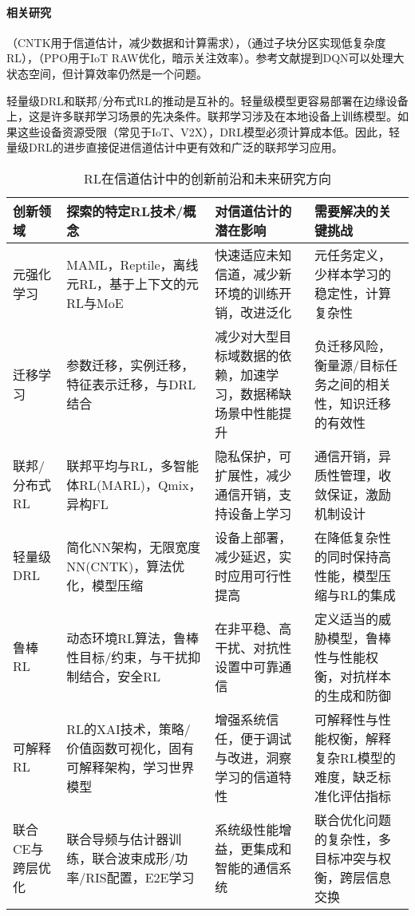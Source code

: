 \documentclass[journal]{IEEEtran}
\begin{document}
\paragraph{相关研究} 
\cite{ref46}（CNTK用于信道估计，减少数据和计算需求），\cite{ref13}（通过子块分区实现低复杂度RL），\cite{ref16}（PPO用于IoT RAW优化，暗示关注效率）。参考文献\cite{ref20}提到DQN可以处理大状态空间，但计算效率仍然是一个问题。

轻量级DRL\cite{ref46}和联邦/分布式RL\cite{ref4}的推动是互补的。轻量级模型更容易部署在边缘设备上，这是许多联邦学习场景的先决条件。联邦学习涉及在本地设备上训练模型\cite{ref55}。如果这些设备资源受限（常见于IoT、V2X），DRL模型必须计算成本低。因此，轻量级DRL的进步直接促进信道估计中更有效和广泛的联邦学习应用。

\begin{table*}[!t]
\caption{RL在信道估计中的创新前沿和未来研究方向}
\label{tab:table3}
\centering
\begin{tabular}{|p{2.5cm}|p{4.5cm}|p{4.5cm}|p{4.5cm}|}
\hline
\textbf{创新领域} & \textbf{探索的特定RL技术/概念} & \textbf{对信道估计的潜在影响} & \textbf{需要解决的关键挑战} \\
\hline
元强化学习 & MAML，Reptile，离线元RL，基于上下文的元RL与MoE & 快速适应未知信道，减少新环境的训练开销，改进泛化 & 元任务定义，少样本学习的稳定性，计算复杂性 \\
\hline
迁移学习 & 参数迁移，实例迁移，特征表示迁移，与DRL结合 & 减少对大型目标域数据的依赖，加速学习，数据稀缺场景中性能提升 & 负迁移风险，衡量源/目标任务之间的相关性，知识迁移的有效性 \\
\hline
联邦/分布式RL & 联邦平均与RL，多智能体RL(MARL)，Qmix，异构FL & 隐私保护，可扩展性，减少通信开销，支持设备上学习 & 通信开销，异质性管理，收敛保证，激励机制设计 \\
\hline
轻量级DRL & 简化NN架构，无限宽度NN(CNTK)，算法优化，模型压缩 & 设备上部署，减少延迟，实时应用可行性提高 & 在降低复杂性的同时保持高性能，模型压缩与RL的集成 \\
\hline
鲁棒RL & 动态环境RL算法，鲁棒性目标/约束，与干扰抑制结合，安全RL & 在非平稳、高干扰、对抗性设置中可靠通信 & 定义适当的威胁模型，鲁棒性与性能权衡，对抗样本的生成和防御 \\
\hline
可解释RL & RL的XAI技术，策略/价值函数可视化，固有可解释架构，学习世界模型 & 增强系统信任，便于调试与改进，洞察学习的信道特性 & 可解释性与性能权衡，解释复杂RL模型的难度，缺乏标准化评估指标 \\
\hline
联合CE与跨层优化 & 联合导频与估计器训练，联合波束成形/功率/RIS配置，E2E学习 & 系统级性能增益，更集成和智能的通信系统 & 联合优化问题的复杂性，多目标冲突与权衡，跨层信息交换 \\
\hline
\end{tabular}
\end{table*}
\end{document}
